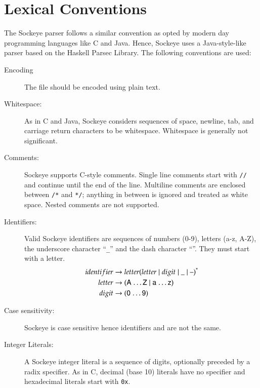 \documentclass[a4paper,11pt,twoside]{report}
\begin{document}
{{{\chapter{Lexical Conventions}
\label{chap:lexer}

The Sockeye parser follows a similar convention as opted by modern day 
programming languages like C and Java. Hence, Sockeye uses a Java-style-like
parser based on the Haskell Parsec Library. The following conventions are used:

\begin{description}
\item[Encoding] The file should be encoded using plain text.
\item[Whitespace:]  As in C and Java, Sockeye considers sequences of
  space, newline, tab, and carriage return characters to be
  whitespace.  Whitespace is generally not significant. 

\item[Comments:] Sockeye supports C-style comments.  Single line comments
  start with \texttt{//} and continue until the end of the line.
  Multiline comments are enclosed between \texttt{/*} and \texttt{*/};
  anything in between is ignored and treated as white space.
  Nested comments are not supported.

\item[Identifiers:] Valid Sockeye identifiers are sequences of numbers
  (0-9), letters (a-z, A-Z), the underscore character ``\texttt{\_}'' and the dash character ``\textendash''. They
  must start with a letter.
  \begin{align*}
  identifier & \rightarrow letter (letter \mid digit \mid \text{\_} \mid \text{\textendash})^{\textrm{*}} \\
  letter & \rightarrow (\textsf{A \ldots Z} \mid  \textsf{a \ldots z})\\
  digit & \rightarrow (\textsf{0 \ldots 9})
    \end{align*}

\item[Case sensitivity:] Sockeye is case sensitive hence identifiers  and  are not the same.
  
\item[Integer Literals:] A Sockeye integer literal is a sequence of
  digits, optionally preceded by a radix specifier.  As in C, decimal (base 10)
  literals have no specifier and hexadecimal literals start with
  \texttt{0x}.


\end{description}}}}
\end{document}
